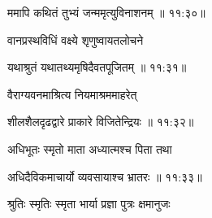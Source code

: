 {\devanagarifont ममापि कथितं तुभ्यं जन्ममृत्युविनाशनम् {॥ ११:३०॥} \veg\dontdisplaylinenum }%


{\devanagarifont वानप्रस्थविधिं वक्ष्ये शृणुष्वायतलोचने \thinspace{\dandab} \dontdisplaylinenum }%


{\devanagarifont यथाश्रुतं यथातथ्यमृषिदैवतपूजितम् {॥ ११:३१॥} \veg\dontdisplaylinenum }%

{\devanagarifont वैराग्यवनमाश्रित्य नियमाश्रममाहरेत् \thinspace{\dandab} \dontdisplaylinenum }%


{\devanagarifont शीलशैलदृढद्वारे प्राकारे विजितेन्द्रियः {॥ ११:३२॥} \veg\dontdisplaylinenum }%

{\devanagarifont अधिभूतः स्मृतो माता अध्यात्मश्च पिता तथा \thinspace{\dandab} \dontdisplaylinenum }%


{\devanagarifont अधिदैविकमाचार्यो व्यवसायाश्च भ्रातरः {॥ ११:३३॥} \veg\dontdisplaylinenum }%

{\devanagarifont श्रुतिः स्मृतिः स्मृता भार्या प्रज्ञा पुत्रः क्षमानुजः \thinspace{\dandab} \dontdisplaylinenum }%

